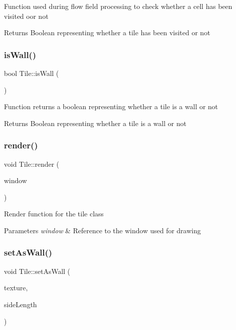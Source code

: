 Function used during flow field processing to check whether a cell has been visited oor not 

\begin{DoxyReturn}{Returns}
Boolean representing whether a tile has been visited or not
\end{DoxyReturn}
\mbox{\label{class_tile_a59472890fde600cb1f11367147c92e74}} 
\subsubsection{\texorpdfstring{isWall()}{isWall()}}
{\footnotesize\ttfamily bool Tile\+::is\+Wall (\begin{DoxyParamCaption}{ }\end{DoxyParamCaption})}



Function returns a boolean representing whether a tile is a wall or not 

\begin{DoxyReturn}{Returns}
Boolean representing whether a tile is a wall or not
\end{DoxyReturn}
\mbox{\label{class_tile_a57444de210a362d359197d5a6b5e16e9}} 
\subsubsection{\texorpdfstring{render()}{render()}}
{\footnotesize\ttfamily void Tile\+::render (\begin{DoxyParamCaption}\item[{sf\+::\+Render\+Window \&}]{window }\end{DoxyParamCaption})}



Render function for the tile class 


\begin{DoxyParams}{Parameters}
{\em window} & Reference to the window used for drawing\\
\hline
\end{DoxyParams}
\mbox{\label{class_tile_accf1f91aace03c7b43bc17b57db57a71}} 
\subsubsection{\texorpdfstring{setAsWall()}{setAsWall()}}
{\footnotesize\ttfamily void Tile\+::set\+As\+Wall (\begin{DoxyParamCaption}\item[{sf\+::\+Texture \&}]{texture,  }\item[{float}]{side\+Length }\end{DoxyParamCaption})}



